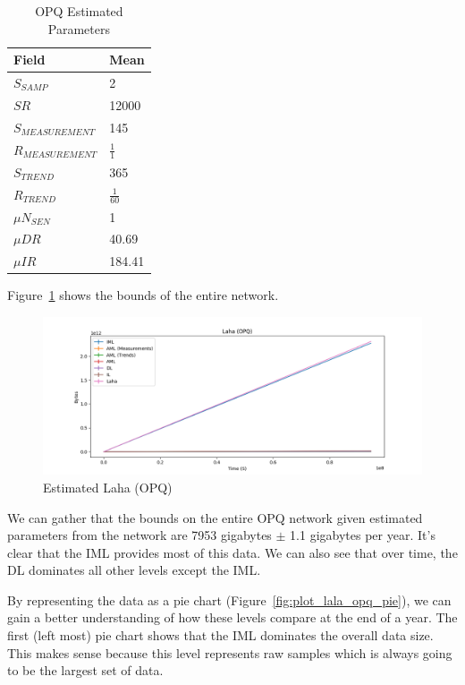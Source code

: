 \begin{table}[H]
	\centering
	\caption{OPQ Estimated Parameters}
	\begin{tabularx}{\textwidth}{ll}
		\toprule
		\textbf{Field} & \textbf{Mean} \\
		\midrule
		$S_{SAMP}$ & 2 \\
		$SR$ & 12000 \\
		$S_{MEASUREMENT}$ & 145 \\
		$R_{MEASUREMENT}$ & $\frac{1}{1}$ \\
		$S_{TREND}$ & 365  \\
		$R_{TREND}$ & $\frac{1}{60}$  \\
		$\mu N_{SEN}$ & 1  \\
		$\mu DR$ & 40.69  \\
		$\mu IR$ & 184.41 \\
		\bottomrule
	\end{tabularx}
	\label{table:estimated_laha_opq}
\end{table}

Figure~\ref{fig:plot_lala_opq} shows the bounds of the entire network.

\begin{figure}[H]
	\centering
	\includegraphics[width=\linewidth]{figures/plot_laha_opq.png}
	\caption{Estimated Laha (OPQ)}
	\label{fig:plot_lala_opq}
\end{figure}

We can gather that the bounds on the entire OPQ network given estimated parameters from the network are 7953 gigabytes $\pm$ 1.1 gigabytes per year. It's clear that the IML provides most of this data. We can also see that over time, the DL dominates all other levels except the IML\@.

By representing the data as a pie chart (Figure~\ref{fig:plot_lala_opq_pie}), we can gain a better understanding of how these levels compare at the end of a year. The first (left most) pie chart shows that the IML dominates the overall data size. This makes sense because this level represents raw samples which is always going to be the largest set of data.

